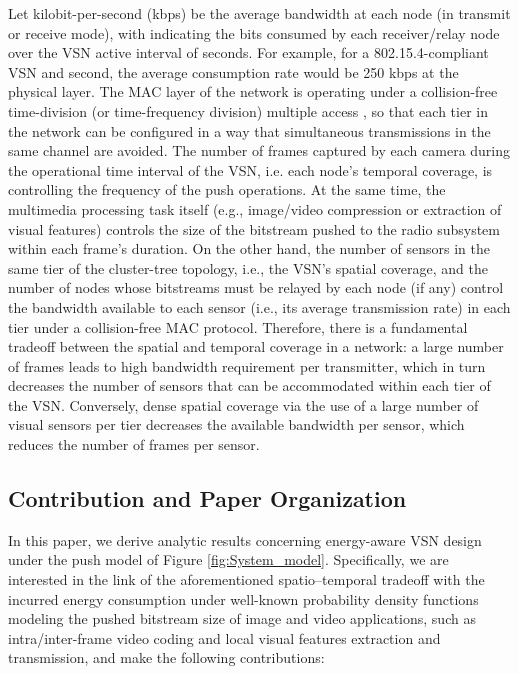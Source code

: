 \documentclass[twocolumn,english]{IEEEtran}
\theoremstyle{plain}
\theoremstyle{definition}
\begin{document}
\noindent Let  kilobit-per-second (kbps) be the average
bandwidth at each node (in transmit or receive mode), with  indicating
the bits consumed by each receiver/relay node over the VSN active
interval of  seconds. For example, for a 802.15.4-compliant VSN
and  second, the average consumption rate would be 250 kbps
at the physical layer. The MAC layer of the network is operating under
a collision-free time-division (or time-frequency division) multiple
access \cite{ehsan2012survey,burana2012DTFDMA,LeungMACEssentials,tinka2010TSCH,degesys2007desync},
so that each tier in the network can be configured in a way that simultaneous
transmissions in the same channel are avoided. The number of frames
captured by each camera during the operational time interval of the
VSN, i.e. each node's temporal coverage, is controlling the frequency
of the push operations. At the same time, the multimedia processing
task itself (e.g., image/video compression or extraction of visual
features) controls the size of the bitstream pushed to the radio subsystem
within each frame's duration. On the other hand, the number of sensors
in the same tier of the cluster-tree topology, i.e., the VSN's spatial
coverage, and the number of nodes whose bitstreams must be relayed
by each node (if any) control the bandwidth available to each sensor
(i.e., its average transmission rate) in each tier under a collision-free
MAC protocol. Therefore, there is a fundamental tradeoff between the
spatial and temporal coverage in a network: a large number of frames
leads to high bandwidth requirement per transmitter, which in turn
decreases the number of sensors that can be accommodated within each
tier of the VSN. Conversely, dense spatial coverage via the use of
a large number of visual sensors per tier decreases the available
bandwidth per sensor, which reduces the number of frames per sensor.


\subsection{Contribution and Paper Organization}

In this paper, we derive analytic results concerning energy-aware
VSN design under the push model of Figure \ref{fig:System_model}.
Specifically, we are interested in the link of the aforementioned
spatio--temporal tradeoff with the incurred energy consumption under
well-known probability density functions modeling the pushed bitstream
size of image and video applications, such as intra/inter-frame video
coding and local visual features extraction and transmission, and
make the following contributions:
\end{document}
